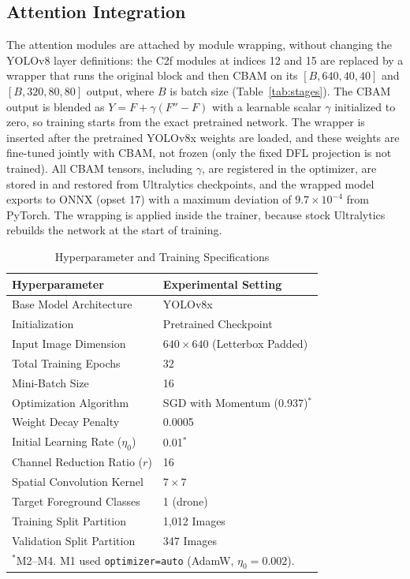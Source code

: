 \documentclass[conference]{IEEEtran}
\begin{document}
\subsection{Attention Integration}

The attention modules are attached by module wrapping, without changing the YOLOv8 layer definitions: the C2f modules at indices 12 and 15 are replaced by a wrapper that runs the original block and then CBAM on its $[B,640,40,40]$ and $[B,320,80,80]$ output, where $B$ is batch size (Table~\ref{tab:stages}). The CBAM output is blended as $Y=F+\gamma(F''-F)$ with a learnable scalar $\gamma$ initialized to zero, so training starts from the exact pretrained network. The wrapper is inserted after the pretrained YOLOv8x weights are loaded, and these weights are fine-tuned jointly with CBAM, not frozen (only the fixed DFL projection is not trained). All CBAM tensors, including $\gamma$, are registered in the optimizer, are stored in and restored from Ultralytics checkpoints, and the wrapped model exports to ONNX (opset 17) with a maximum deviation of $9.7\times10^{-4}$ from PyTorch. The wrapping is applied inside the trainer, because stock Ultralytics rebuilds the network at the start of training.

\begin{table}[!t]
\caption{Hyperparameter and Training Specifications}
\label{tab:hyper}
\centering
\renewcommand{\arraystretch}{1.1}
\begin{tabular}{|l|l|}
\hline
\textbf{Hyperparameter} & \textbf{Experimental Setting} \\
\hline
Base Model Architecture   & YOLOv8x \\
Initialization            & Pretrained Checkpoint \\
Input Image Dimension     & $640\times640$ (Letterbox Padded) \\
Total Training Epochs     & 32 \\
Mini-Batch Size           & 16 \\
Optimization Algorithm    & SGD with Momentum (0.937)$^{*}$ \\
Weight Decay Penalty      & 0.0005 \\
Initial Learning Rate ($\eta_0$) & 0.01$^{*}$ \\
Channel Reduction Ratio ($r$)    & 16 \\
Spatial Convolution Kernel       & $7\times7$ \\
Target Foreground Classes        & 1 (drone) \\
Training Split Partition         & 1,012 Images \\
Validation Split Partition       & 347 Images \\
\hline
\multicolumn{2}{l}{\footnotesize $^{*}$M2--M4. M1 used \texttt{optimizer=auto} (AdamW, $\eta_0=0.002$).}\\
\end{tabular}
\end{table}
\end{document}
